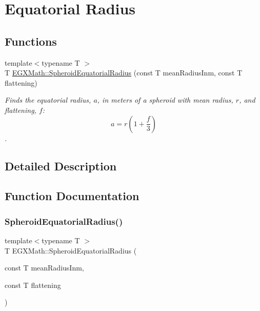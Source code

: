 \hypertarget{group___e_g_x_math-_geometry-3_d-_spheroid-_equatorial_radius}{}\section{Equatorial Radius}
\label{group___e_g_x_math-_geometry-3_d-_spheroid-_equatorial_radius}
\subsection*{Functions}
\begin{DoxyCompactItemize}
\item 
{\footnotesize template$<$typename T $>$ }\\T \mbox{\hyperlink{group___e_g_x_math-_geometry-3_d-_spheroid-_equatorial_radius_ga1cbe564fee1b509c622d1c6d276158cd}{E\+G\+X\+Math\+::\+Spheroid\+Equatorial\+Radius}} (const T mean\+Radius\+Inm, const T flattening)
\begin{DoxyCompactList}\small\item\em Finds the equatorial radius, $a$, in meters of a spheroid with mean radius, $r$, and flattening, $f$\+: \[ a = r \left (1 + \dfrac{f}{3} \right ) \]. \end{DoxyCompactList}\end{DoxyCompactItemize}


\subsection{Detailed Description}


\subsection{Function Documentation}
\mbox{\label{group___e_g_x_math-_geometry-3_d-_spheroid-_equatorial_radius_ga1cbe564fee1b509c622d1c6d276158cd}} 
\subsubsection{\texorpdfstring{Spheroid\+Equatorial\+Radius()}{SpheroidEquatorialRadius()}}
{\footnotesize\ttfamily template$<$typename T $>$ \\
T E\+G\+X\+Math\+::\+Spheroid\+Equatorial\+Radius (\begin{DoxyParamCaption}\item[{const T}]{mean\+Radius\+Inm,  }\item[{const T}]{flattening }\end{DoxyParamCaption})}



